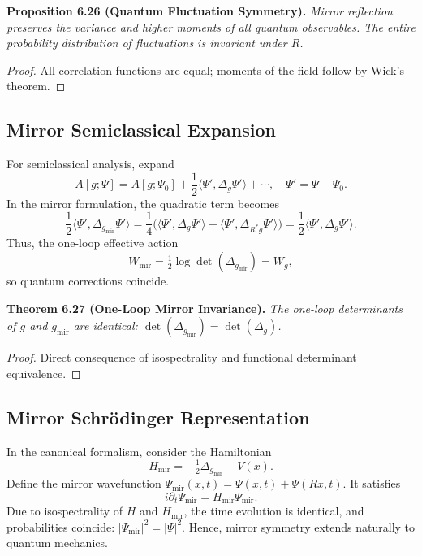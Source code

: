 \noindent
\textbf{Proposition 6.26 (Quantum Fluctuation Symmetry).}
\emph{Mirror reflection preserves the variance and higher moments
of all quantum observables.
The entire probability distribution of fluctuations
is invariant under \(R\).}

\begin{proof}
All correlation functions are equal;
moments of the field follow by Wick’s theorem.
\end{proof}

\subsection{Mirror Semiclassical Expansion}\relax \hspace{0pt}

For semiclassical analysis, expand
\[
A[g;\Psi]
=A[g;\Psi_{0}]
+\frac{1}{2}\langle\Psi',\Delta_g\Psi'\rangle
+\cdots,
\quad \Psi'=\Psi-\Psi_{0}.
\]
In the mirror formulation,
the quadratic term becomes
\[
\frac{1}{2}\langle\Psi',\Delta_{g_{\mathrm{mir}}}\Psi'\rangle
=\frac{1}{4}
\big(\langle\Psi',\Delta_g\Psi'\rangle
+\langle\Psi',\Delta_{R^{*}g}\Psi'\rangle\big)
=\frac{1}{2}\langle\Psi',\Delta_g\Psi'\rangle.
\]
Thus, the one-loop effective action
\[
W_{\mathrm{mir}}
=\tfrac{1}{2}\log\det(\Delta_{g_{\mathrm{mir}}})
=W_{g},
\]
so quantum corrections coincide.

\noindent
\textbf{Theorem 6.27 (One-Loop Mirror Invariance).}
\emph{The one-loop determinants of \(g\) and \(g_{\mathrm{mir}}\)
are identical:
\(\det(\Delta_{g_{\mathrm{mir}}})=\det(\Delta_g)\).}

\begin{proof}
Direct consequence of isospectrality and
functional determinant equivalence.
\end{proof}

\subsection{Mirror Schrödinger Representation}\relax \hspace{0pt}

In the canonical formalism,
consider the Hamiltonian
\[
H_{\mathrm{mir}}
=-\tfrac{1}{2}\Delta_{g_{\mathrm{mir}}}+V(x).
\]
Define the mirror wavefunction
\(\Psi_{\mathrm{mir}}(x,t)=\Psi(x,t)+\Psi(Rx,t)\).
It satisfies
\[
i\partial_t \Psi_{\mathrm{mir}}
=H_{\mathrm{mir}}\Psi_{\mathrm{mir}}.
\]
Due to isospectrality of \(H\) and \(H_{\mathrm{mir}}\),
the time evolution is identical,
and probabilities coincide:
\(|\Psi_{\mathrm{mir}}|^{2}=|\Psi|^{2}\).
Hence, mirror symmetry extends naturally to quantum mechanics.

